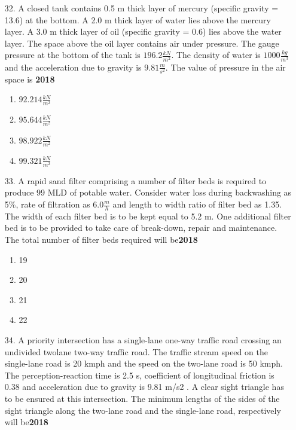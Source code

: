 \documentclass[journal]{IEEEtran}
\begin{document}
\begin{enumerate}
    \item[32.] A closed tank contains 0.5 m thick layer of mercury (specific gravity = 13.6) at the bottom.
    A 2.0 m thick layer of water lies above the mercury layer. A 3.0 m thick layer of oil
    (specific gravity = 0.6) lies above the water layer. The space above the oil layer contains
    air under pressure. The gauge pressure at the bottom of the tank is $196.2 \frac{kN}{m^2}$. The density of water is $1000 \frac{kg}{m^3}$
    and the acceleration due to gravity is $9.81 \frac{m}{s^2}$. The value
    of pressure in the air space is \hfill \textbf{2018}
    \begin{enumerate}[label=(\Alph*)]
        \item $92.214 \frac{kN}{m^2}$
        \item $95.644 \frac{kN}{m^2}$
        \item $98.922 \frac{kN}{m^2}$
        \item $99.321 \frac{kN}{m^2}$
    \end{enumerate} 
    \item[33.] A rapid sand filter comprising a number of filter beds is required to produce 99 MLD of
    potable water. Consider water loss during backwashing as 5\%, rate of filtration as $6.0 \frac{m}{h}$
    and length to width ratio of filter bed as 1.35. The width of each filter bed is to be kept
    equal to 5.2 m. One additional filter bed is to be provided to take care of break-down,
    repair and maintenance. The total number of filter beds required will be\hfill \textbf{2018}
    \begin{enumerate}[label=(\Alph*)]
        \item 19
        \item 20
        \item 21
        \item 22
    \end{enumerate}
    \item[34.] A priority intersection has a single-lane one-way traffic road crossing an undivided twolane two-way traffic road. The traffic stream speed on the single-lane road is 20 kmph and
    the speed on the two-lane road is 50 kmph. The perception-reaction time is 2.5 s, coefficient of longitudinal friction is 0.38 and acceleration due to gravity is 9.81 m/s2
    . A clear sight triangle has to be ensured at this intersection. The minimum lengths of the sides
    of the sight triangle along the two-lane road and the single-lane road, respectively will be\hfill \textbf{2018}
    \begin{enumerate}[label=(\Alph*)]

\end{enumerate}
\end{enumerate}
\end{document}
